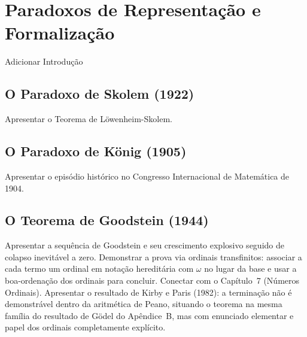 \chapter{Paradoxos de Representação e Formalização}
\label{chap:apendiceRepresentacaoFormalizacao}

Adicionar Introdução

\section{O Paradoxo de Skolem (1922)}

Apresentar o Teorema de Löwenheim-Skolem.

\section{O Paradoxo de König (1905)}

Apresentar o episódio histórico no Congresso Internacional de
Matemática de 1904.

\section{O Teorema de Goodstein (1944)}

Apresentar a sequência de Goodstein e seu crescimento explosivo
seguido de colapso inevitável a zero. Demonstrar a prova via
ordinais transfinitos: associar a cada termo um ordinal em
notação hereditária com \(\omega\) no lugar da base e usar a
boa-ordenação dos ordinais para concluir. Conectar com o
Capítulo~7 (Números Ordinais). Apresentar o resultado de
Kirby e Paris (1982): a terminação não é demonstrável dentro
da aritmética de Peano,
situando o teorema na mesma família do resultado de Gödel
do Apêndice~B, mas com enunciado elementar e papel dos
ordinais completamente explícito.